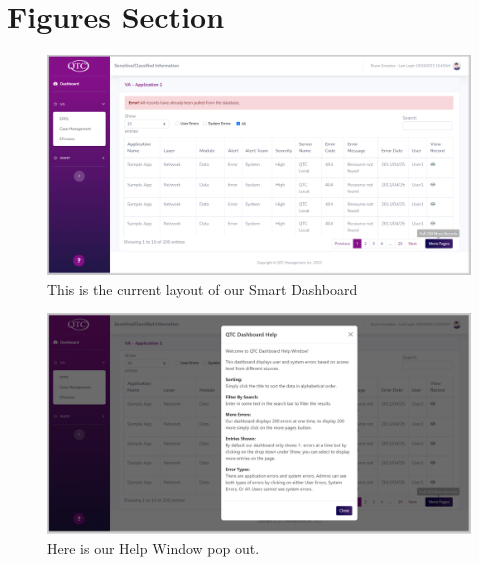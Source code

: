 \documentclass[12pt]{article}
\begin{document}
\section{Figures Section}
\begin{figure}[h]
\caption{This is the current layout of our Smart Dashboard}
\includegraphics[width=\textwidth]{General}
\end{figure}

\begin{figure}[h]
\caption{Here is our Help Window pop out.}
\includegraphics[width=\textwidth]{Help_Window}
\end{figure}
\end{document}
